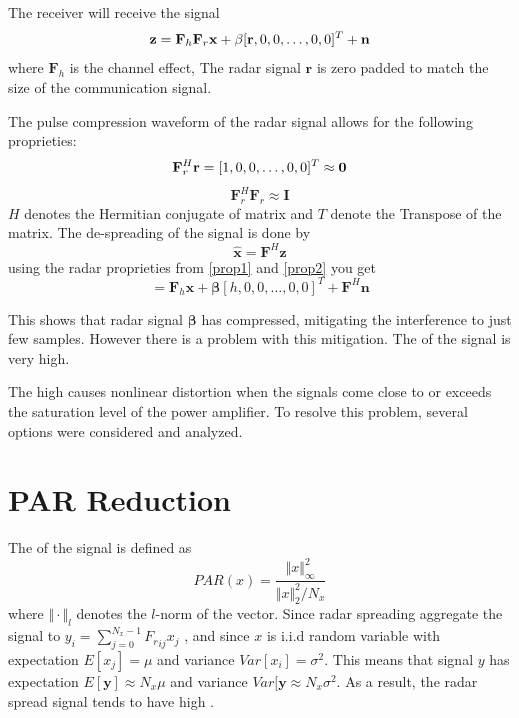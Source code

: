 \documentclass[conference]{IEEEtran}
\begin{document}
The receiver will receive the signal
\begin{equation}
\mathbf{z}=\mathbf{F}_h \mathbf{F}_r \mathbf{x} +\beta[\mathbf{r},0,0,\dots,0,0]^T +\mathbf{n}\\
\label{eq2}
\end{equation} 
where $\mathbf{F}_h$ is the channel effect, The radar signal $\mathbf{r}$ is zero padded to match the size of the communication signal.

The pulse compression waveform of the radar signal allows for the following proprieties:
\begin{equation}
\mathbf{F}_r^H \mathbf{r} = [1,0,0,\dots,0,0]^T\approx\mathbf{0} \\
\label{prop1}
\end{equation}
\begin{equation}
\mathbf{F}_r^H \mathbf{F}_r \approx \mathbf{I}
\label{prop2}
\end{equation}
$H$ denotes the Hermitian conjugate of matrix and $T$ denote the Transpose of the matrix.
The de-spreading of the signal is done by
\begin{equation}
\mathbf{\hat{x}}=\mathbf{F}^H\mathbf{z}
\end{equation}
using the radar proprieties from \eqref{prop1} and \eqref{prop2} you get
\begin{equation}
=\mathbf{F}_h\mathbf{x}+\boldsymbol{\beta}[h,0,0,\dots,0,0]^T+\mathbf{F}^H\mathbf{n}
\end{equation} 

This shows that radar signal $\boldsymbol{\beta}$ has compressed, mitigating the interference to just few samples.  However there is a problem with this mitigation.  The \PAR of the signal is very high.  

The high \PAR causes nonlinear distortion when the signals come close to or exceeds the saturation level of the power amplifier.  To resolve this problem, several options were considered and analyzed.

\section{PAR Reduction}
The \PAR of the signal is defined as
\begin{equation}
PAR(x)=\frac{\Vert x \Vert^2_\infty}{\Vert x \Vert^2_2/N_x}
\end{equation}
where $\Vert\cdot\Vert_l$ denotes the $l$-norm of the vector.  Since radar spreading aggregate the signal to $y_i=\sum_{j=0}^{N_x-1} {F_r}_{ij}x_j$ , and since $x$ is i.i.d random variable with expectation $E[x_j]=\mu$ and variance $Var[x_i]=\sigma^2$.  This means that signal $y$ has expectation $E[\mathbf{y}]\approx N_x\mu$ and variance $Var[\mathbf{y}\approx N_x\sigma^2$.  As a result, the radar spread signal tends to have high \PAR.
\end{document}
